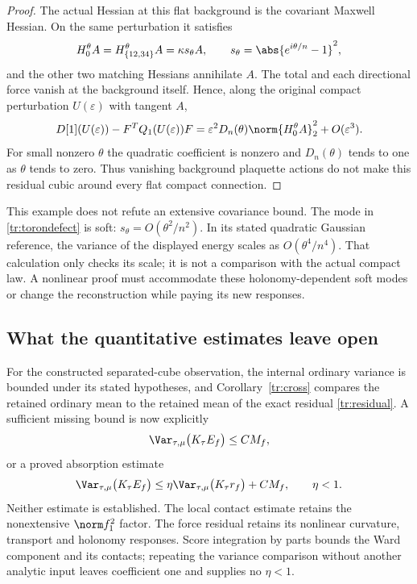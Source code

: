 \begin{proof}
The actual Hessian at this flat background is the covariant Maxwell Hessian.
On the same perturbation it satisfies
\[
 H_0^\theta A=H_{\{12,34\}}^\theta A
    =\kappa s_\theta A,\qquad
 s_\theta=\abs{e^{i\theta/n}-1}^2,
\]
and the other two matching Hessians annihilate \(A\). The total and each
directional force vanish at the background itself. Hence, along the original
compact perturbation \(U(\varepsilon)\) with tangent \(A\),
\begin{equation}
 D[1](U(\varepsilon))-F^TQ_1(U(\varepsilon))F
   =\varepsilon^2D_n(\theta)\norm{H_0^\theta A}_2^2
       +O(\varepsilon^3).
 \label{tr:torondefect}
\end{equation}
For small nonzero \(\theta\) the quadratic coefficient is nonzero and
\(D_n(\theta)\) tends to one as \(\theta\) tends to zero. Thus vanishing
background plaquette actions do not make this residual cubic around every
flat compact connection.
\end{proof}

This example does not refute an extensive covariance bound. The mode in
\eqref{tr:torondefect} is soft:
\(s_\theta=O(\theta^2/n^2)\). In its stated quadratic Gaussian reference,
the variance of the displayed energy scales as \(O(\theta^4/n^4)\).
That calculation only checks its scale; it is not a comparison with the
actual compact law. A nonlinear proof must accommodate these holonomy-dependent
soft modes or change the reconstruction while paying its new responses.

\subsection{What the quantitative estimates leave open}

For the constructed separated-cube observation, the internal ordinary
variance is bounded under its stated hypotheses, and
Corollary~\ref{tr:cross} compares the retained ordinary mean to the retained
mean of the exact residual \eqref{tr:residual}. A sufficient missing bound
is now explicitly
\begin{equation}
 \Var_{\tau,\mu}\bigl(K_\tau E_f\bigr)\le CM_f,
 \label{tr:missing}
\end{equation}
or a proved absorption estimate
\begin{equation}
 \Var_{\tau,\mu}\bigl(K_\tau E_f\bigr)
   \le\eta\Var_{\tau,\mu}\bigl(K_\tau r_f\bigr)+CM_f,
 \qquad \eta<1.
 \label{tr:missingabsorption}
\end{equation}
Neither estimate is established. The local contact estimate retains the
nonextensive \(\norm f_1^2\) factor. The force residual retains its nonlinear
curvature, transport and holonomy responses. Score integration by parts
bounds the Ward component and its contacts; repeating the variance comparison
without another analytic input leaves coefficient one and supplies no
\(\eta<1\).

